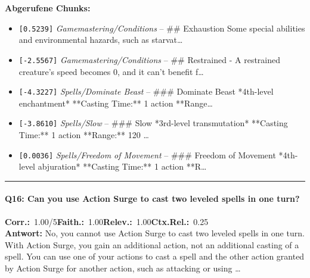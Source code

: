 \noindent\textbf{Abgerufene Chunks:}
\begin{itemize}[noitemsep, topsep=2pt]
  \item[\textbf{\#1}] \texttt{[0.5239]} \textit{Gamemastering/Conditions} -- \#\# Exhaustion  Some special abilities and environmental hazards, such as starvat\ldots
  \item[\textbf{\#2}] \texttt{[-2.5567]} \textit{Gamemastering/Conditions} -- \#\# Restrained  - A restrained creature's speed becomes 0, and it can't benefit f\ldots
  \item[\textbf{\#3}] \texttt{[-4.3227]} \textit{Spells/Dominate Beast} -- \#\#\# Dominate Beast  *4th-level enchantment*  **Casting Time:** 1 action  **Range\ldots
  \item[\textbf{\#4}] \texttt{[-3.8610]} \textit{Spells/Slow} -- \#\#\# Slow  *3rd-level transmutation*  **Casting Time:** 1 action  **Range:** 120 \ldots
  \item[\textbf{\#5}] \texttt{[0.0036]} \textit{Spells/Freedom of Movement} -- \#\#\# Freedom of Movement  *4th-level abjuration*  **Casting Time:** 1 action  **R\ldots
\end{itemize}
\vspace{4pt}
\hrule
\vspace{6pt}

\paragraph{Q16: Can you use Action Surge to cast two leveled spells in one turn?}
\noindent \textbf{Corr.:}~1.00/5\quad \textbf{Faith.:}~1.00\quad \textbf{Relev.:}~1.00\quad \textbf{Ctx.Rel.:}~0.25\\

\noindent\textbf{Antwort:} No, you cannot use Action Surge to cast two leveled spells in one turn. With Action Surge, you gain an additional action, not an additional casting of a spell. You can use one of your actions to cast a spell and the other action granted by Action Surge for another action, such as attacking or using \ldots

